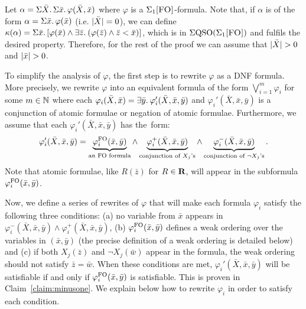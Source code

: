 \medskip

  Let $\alpha =  \Sigma{\bar{X}}.\,\Sigma{\bar{x}}.\, \varphi(\bar{X},\bar{x})$ where $\varphi$ is a $\Sigma_{1}\textsc{[FO]}$-formula.
Note that, if $\alpha$ is of the form $\alpha = \Sigma{\bar{x}}.\, \varphi(\bar{x})$ (i.e. $\vert \bar{X} \vert = 0$), we can define $\kappa(\alpha) = \Sigma{\bar{x}}.\, [\varphi(\bar{x})\wedge \exists{\bar{z}}.\:(\varphi(\bar{z})\wedge\bar{z} < \bar{x})]$, which is in $\Sigma{\rm QSO}(\Sigma_{1}\textsc{[FO]})$ and fulfils the desired property. 
Therefore, for the rest of the proof we can assume that $\vert \bar{X} \vert > 0$ and $\vert \bar{x} \vert > 0$.

To simplify the analysis of $\varphi$, the first step is to rewrite $\varphi$ as a DNF formula. 
More precisely, we rewrite $\varphi$ into an equivalent formula of the form $\bigvee_{i = 1}^m \varphi_i$ for some $m\in \mathbb{N}$ where each $\varphi_i(\bar{X}, \bar{x}) = \exists{\bar{y}}.\: \varphi_i'(\bar{X}, \bar{x}, \bar{y})$ and $\varphi_i'(\bar{X}, \bar{x}, \bar{y})$ is a conjunction of atomic formulae or negation of atomic formulae. Furthermore, we assume that each $\varphi_i'(\bar{X}, \bar{x}, \bar{y})$ has the~form:
$$
\varphi_i'(\bar{X}, \bar{x}, \bar{y}) =  \underbrace{\varphi_i^{{\rm FO}}(\bar{x},\bar{y})}_{\text{an ${\rm FO}$ formula}} \wedge 
\underbrace{\varphi_i^{+}(\bar{X},\bar{x},\bar{y})}_{\text{conjunction of $X_j$'s}} \wedge
\underbrace{\varphi_i^{-}(\bar{X},\bar{x},\bar{y})}_{\text{conjunction of $\neg X_j$'s}}.
$$
Note that atomic formulae, like $R(\bar{z})$ for $R \in \mathbf{R}$, will appear in the subformula $\varphi_i^{{\rm FO}}(\bar{x},\bar{y})$. 

Now, we define a series of rewrites of $\varphi$ that will make each formula $\varphi_i$ satisfy the following three conditions: (a) no variable from $\bar{x}$ appears in $\varphi_i^{-}(\bar{X},\bar{x},\bar{y})\wedge\varphi_i^{+}(\bar{X},\bar{x},\bar{y})$, (b) $\varphi_i^{{\rm FO}}(\bar{x},\bar{y})$ defines a weak ordering over the variables in $(\bar{x},\bar{y})$ (the precise definition of a weak ordering is detailed below) and (c) if both $X_j(\bar{z})$ and $\neg X_j(\bar{w})$ appear in the formula, the weak ordering should not satisfy $\bar{z} = \bar{w}$.
When these conditions are met, $\varphi_i'(\bar{X}, \bar{x}, \bar{y})$ will be satisfiable if and only if $\varphi_i^{{\rm FO}}(\bar{x},\bar{y})$ is satisfiable. This is proven in Claim~\ref{claim:minusone}.
We explain below how to rewrite $\varphi_i$ in order to satisfy each condition.

\medskip

